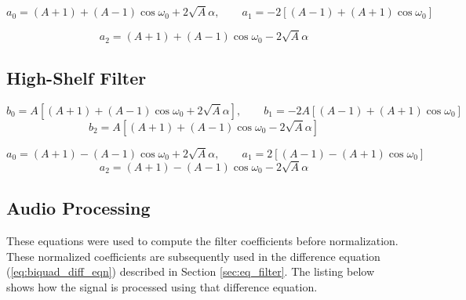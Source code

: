 $$
a_0=(A+1)+(A-1)\cos\omega_0+2\sqrt{A}\alpha, \qquad a_1=-2\left[(A-1)+(A+1)\cos\omega_0\right]
$$

$$
a_2=(A+1)+(A-1)\cos\omega_0-2\sqrt{A}\alpha
$$



\subsection{High-Shelf Filter}
$$
b_0=A\left[(A+1)+(A-1)\cos\omega_0+2\sqrt{A}\alpha\right], \qquad b_1=-2A\left[(A-1)+(A+1)\cos\omega_0\right]
$$
$$
b_2=A\left[(A+1)+(A-1)\cos\omega_0-2\sqrt{A}\alpha\right]
$$

$$
a_0=(A+1)-(A-1)\cos\omega_0+2\sqrt{A}\alpha, \qquad a_1=2\left[(A-1)-(A+1)\cos\omega_0\right]
$$
$$
a_2=(A+1)-(A-1)\cos\omega_0-2\sqrt{A}\alpha
$$



\subsection{Audio Processing}
These equations were used to compute the filter coefficients before normalization. These normalized 
coefficients are subsequently used in the difference equation (\ref{eq:biquad_diff_eqn}) described in
Section \ref{sec:eq_filter}. The listing below shows how the signal is processed using that difference
equation.


